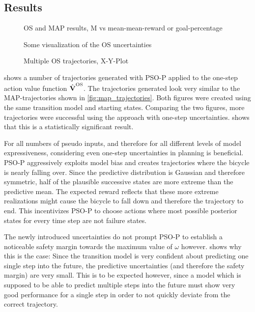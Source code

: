 \subsection{Results}
\begin{figure}[tp]
    \centering
    \caption{OS and MAP results, M vs mean-mean-reward or goal-percentage}
    \label{fig:os_results}
\end{figure}
\begin{figure}[tp]
    \centering
    \caption{Some visualization of the OS uncertainties}
    \label{fig:os_uncertainties}
\end{figure}
\begin{figure}[p]
    \centering
    \caption{Multiple OS trajectories, X-Y-Plot}
    \label{fig:os_trajectories}
\end{figure}
 shows a number of trajectories generated with PSO-P applied to the one-step action value function $\operatorname{\hat{\operatorname{\mathbf{V}}}}^{\text{OS}}$.
The trajectories generated look very similar to the MAP-trajectories shown in \cref{fig:map_trajectories}.
Both figures were created using the same transition model and starting states.
Comparing the two figures, more trajectories were successful using the approach with one-step uncertainties.
 shows that this is a statistically significant result.

For all numbers of pseudo inputs, and therefore for all different levels of model expressiveness, considering even one-step uncertainties in planning is beneficial.
PSO-P aggressively exploits model bias and creates trajectories where the bicycle is nearly falling over.
Since the predictive distribution is Gaussian and therefore symmetric, half of the plausible successive states are more extreme than the predictive mean.
The expected reward reflects that these more extreme realizations might cause the bicycle to fall down and therefore the trajectory to end.
This incentivizes PSO-P to choose actions where most possible posterior states for every time step are not failure states.

The newly introduced uncertainties do not prompt PSO-P to establish a noticeable safety margin towards the maximum value of $\omega$ however.
 shows why this is the case:
Since the transition model is very confident about predicting one single step into the future, the predictive uncertainties (and therefore the safety margin) are very small.
This is to be expected however, since a model which is supposed to be able to predict multiple steps into the future must show very good performance for a single step in order to not quickly deviate from the correct trajectory.

